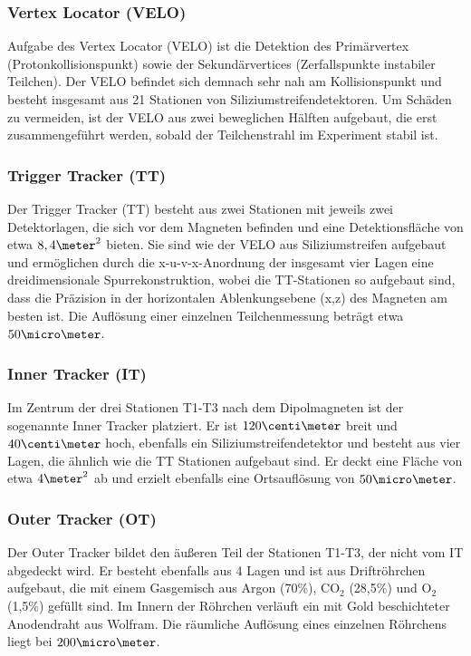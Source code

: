 \subsubsection{Vertex Locator (VELO)}
Aufgabe des Vertex Locator (VELO) ist die Detektion des Primärvertex (Protonkollisionspunkt) sowie der Sekundärvertices (Zerfallspunkte instabiler Teilchen). Der VELO befindet sich demnach sehr nah am Kollisionspunkt und besteht insgesamt aus 21 Stationen von Siliziumstreifendetektoren. Um Schäden zu vermeiden, ist der VELO aus zwei beweglichen Hälften aufgebaut, die erst zusammengeführt werden, sobald der Teilchenstrahl im Experiment stabil ist.

\subsubsection{Trigger Tracker (TT)}
Der Trigger Tracker (TT) besteht aus zwei Stationen mit jeweils zwei Detektorlagen, die sich vor dem Magneten befinden und eine Detektionsfläche von etwa $8,4\meter^2$ bieten. Sie sind wie der VELO aus Siliziumstreifen aufgebaut und ermöglichen durch die x-u-v-x-Anordnung der insgesamt vier Lagen eine dreidimensionale Spurrekonstruktion, wobei die TT-Stationen so aufgebaut sind, dass die Präzision in der horizontalen Ablenkungsebene (x,z) des Magneten am besten ist. Die Auflösung einer einzelnen Teilchenmessung beträgt etwa $50\micro\meter$.

\subsubsection{Inner Tracker (IT)}
Im Zentrum der drei Stationen T1-T3 nach dem Dipolmagneten ist der sogenannte Inner Tracker platziert. Er ist $120\centi\meter$ breit und $40\centi\meter$ hoch, ebenfalls ein Siliziumstreifendetektor und besteht aus vier Lagen, die ähnlich wie die TT Stationen aufgebaut sind. Er deckt eine Fläche von etwa $4\meter^2$ ab und erzielt ebenfalls eine Ortsauflösung von $50\micro\meter$.

\subsubsection{Outer Tracker (OT)}
Der Outer Tracker bildet den äußeren Teil der Stationen T1-T3, der nicht vom IT abgedeckt wird. Er besteht ebenfalls aus 4 Lagen und ist aus Driftröhrchen aufgebaut, die mit einem Gasgemisch aus Argon (70\%), CO$_2$ (28,5\%) und O$_2$ (1,5\%) gefüllt sind. Im Innern der Röhrchen verläuft ein mit Gold beschichteter Anodendraht aus Wolfram. Die räumliche Auflösung eines einzelnen Röhrchens liegt bei $200\micro\meter$.


